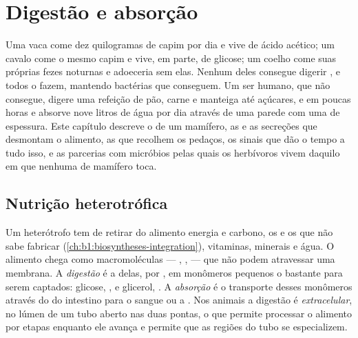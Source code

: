 \chapter{Digestão e absorção}\label{ch:b1:digestion-absorption}

Uma vaca come dez quilogramas de capim por dia e vive de ácido
acético; um cavalo come o mesmo capim e vive, em parte, de glicose; um
coelho come suas próprias fezes noturnas e adoeceria sem elas. Nenhum
deles consegue digerir , e todos o fazem, mantendo bactérias
que conseguem. Um ser humano, que não consegue, digere uma refeição de
pão, carne e manteiga até açúcares,  e  em
poucas horas e absorve nove litros de água por dia através de uma
parede com uma  de espessura. Este capítulo descreve o  de um mamífero, as  e as secreções que desmontam o
alimento, as  que recolhem os pedaços, os sinais que dão o
tempo a tudo isso, e as parcerias com micróbios pelas quais os
herbívoros vivem daquilo em que nenhuma  de mamífero toca.

\section{Nutrição heterotrófica}

\begin{definition}\label{def:b1:digestion-absorption:nutrition}
Um heterótrofo tem de retirar do alimento energia e carbono, os
 e os  que não sabe fabricar
(\cref{ch:b1:biosyntheses-integration}), vitaminas, minerais e água. O
alimento chega como macromoléculas --- , ,  --- que
não podem atravessar uma membrana. A \emph{digestão} é a 
delas, por , em monômeros pequenos o bastante para serem
captados: glicose, ,  e glicerol, .
A \emph{absorção} é o transporte desses monômeros através do 
do intestino para o sangue ou a . Nos animais a digestão é
\emph{extracelular}, no lúmen de um tubo aberto nas duas pontas, o que
permite processar o alimento por etapas enquanto ele avança e permite
que as regiões do tubo se especializem.
\end{definition}


